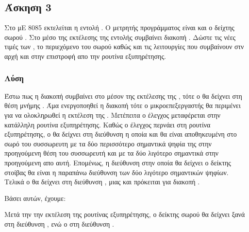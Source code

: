 \newpage \subsection*{Άσκηση 3}

Στο μΕ 8085 εκτελείται η εντολή . Ο μετρητής προγράμματος είναι  και ο δείχτης σωρού . Στο μέσο της εκτέλεσης
της εντολής 	συμβαίνει διακοπή . Δώστε τις νέες τιμές των , το περιεχόμενο του σωρού καθώς και τις λειτουργίες που συμβαίνουν
στν αρχή και στην επιστροφή απο την ρουτίνα εξυπηρέτησης.


\subsubsection*{Λύση}

Έστω πως η διακοπή συμβαίνει στο μέσον της εκτέλεσης της , τότε ο  θα δείχνει στη θέση μνήμης .
Άμα ενεργοποηθεί η διακοπή τότε ο μικροεπεξεργαστής θα περιμένει για να ολοκληρωθεί η εκτέλεση της .
Μετέπειτα ο έλεγχος μεταφέρεται στην κατάλληλη ρουτίνα εξυπηρέτησης. Kαθώς ο έλεγχος περνάει στη ρουτίνα εξυπηρέτησης,
ο  θα δείχνει στη διεύθυνση  η οποία και θα είναι αποθηκευμένη στο σωρό του συσσωρευτη με τα δύο περισσότερο 
σημαντικά ψηφία της στην προηγούμενη θέση του συσσωρευτή και με τα δύο λιγότερο σημαντικά στην προηγούμενη απο αυτή. 
Επομένως, η διεύθυνση στην οποία θα δείχνει ο δείκτης στοίβας θα είναι η παραπάνω διεύθυνση των δύο λιγότερο σημαντικών ψηφίων. 
Τελικά ο  θα δείχνει στη διεύθυνση , μιας και πρόκειται για διακοπή .

Βάσει αυτών, έχουμε:


Μετά την την εκτέλεση της ρουτίνας εξυπηρέτησης, ο δείκτης σωρού θα δείχνει ξανά στη διεύθυνση , ενώ ο  στη 
διεύθυνση .
